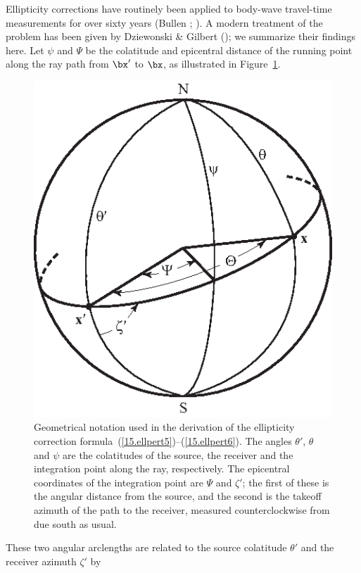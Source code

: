 Ellipticity corrections have routinely been applied to
body-wave travel-time measurements for over sixty years
(Bullen \citeyear{bullen37}; \citeyear{bullen63}).
A modern treatment of the problem has been given by
Dziewonski \& Gilbert (\citeyear{dziewonski&gilbert76});
we summarize their findings here.  Let $\psi$ and $\Psi$
be the colatitude and epicentral distance of the running
point along the ray path from $\bx'$ to $\bx$, as illustrated
in Figure~\ref{15.fig.ellip}.
\begin{figure}[!b]
\begin{center}
\includegraphics{../figures/chap15/fig11.eps}
\end{center}
\caption[ellipticity correction]
{\label{15.fig.ellip}
Geometrical notation used in the derivation of the ellipticity
correction formula~(\ref{15.ellpert5})--(\ref{15.ellpert6}).
The angles $\theta'$, $\theta$ and $\psi$ are the colatitudes
of the source, the receiver and the integration point along the
ray, respectively. The epicentral coordinates of the integration
point are $\Psi$ and $\zeta'$; the first of these is the angular
distance from the source, and the second is the takeoff azimuth
of the path to the receiver, measured counterclockwise from due
south as usual.
}
\end{figure}
These two angular arclengths are related to the
source colatitude $\theta'$ and the receiver azimuth $\zeta'$ by
